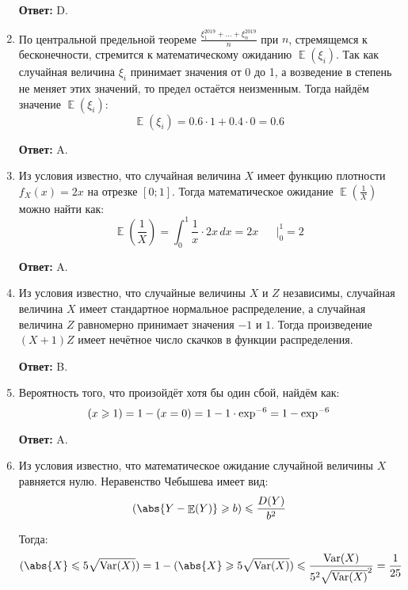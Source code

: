 \documentclass[a4paper]{article} %
\DeclareMathOperator{\Var}{Var}
\DeclareMathOperator{\E}{\mathbb{E}}
\let\P\relax
\DeclareMathOperator{\P}{\mathbb{P}}
\renewcommand{\le}{\leqslant}
\renewcommand{\ge}{\geqslant}
\begin{document}
\begin{enumerate}
    \textbf{Ответ:} D.
    
    
    \item
    По центральной предельной теореме $\frac{\xi_{1}^{2019} + \ldots + \xi_{n}^{2019}}{n}$ при $n$, стремящемся к бесконечности, стремится к математическому ожиданию $\E(\xi_{i})$.
    Так как случайная величина $\xi_{i}$ принимает значения от 0 до 1, а возведение в степень не меняет этих значений, то предел остаётся неизменным.
    Тогда найдём значение $\E(\xi_{i})$:
    \[
    \E(\xi_{i}) = 0.6 \cdot 1 + 0.4 \cdot 0 = 0.6
    \]

    \textbf{Ответ:} A.
    
    \item
    Из условия известно, что случайная величина $X$ имеет функцию плотности $f_{X}(x) = 2x$ на отрезке $[0; 1]$.
    Тогда математическое ожидание $\E\left(\frac{1}{X} \right)$ можно найти как:
    \[
    \E\left(\frac{1}{X} \right) = \int_{0}^{1} \frac{1}{x} \cdot 2x \,dx = 2x \left.\begin{matrix} & \\ & \end{matrix}\right|_{0}^{1} = 2
    \]
    
    \textbf{Ответ:} A.
    
    
    \item
    Из условия известно, что случайные величины $X$ и $Z$ независимы, случайная величина $X$ имеет стандартное нормальное распределение, а случайная величина $Z$ равномерно принимает значения $-1$ и $1$.
    Тогда произведение $(X + 1)Z$ имеет нечётное число скачков в функции распределения.
    
    \textbf{Ответ:} B.
    
    
    \item
    Вероятность того, что произойдёт хотя бы один сбой, найдём как:
    \[
    \P(x \ge 1) = 1 - \P(x = 0) = 1 - 1 \cdot \exp^{-6} = 1 - \exp^{-6}
    \]
    
    \textbf{Ответ:} A.
    
    
    \item
    Из условия известно, что математическое ожидание случайной величины $X$ равняется нулю.
    Неравенство Чебышева имеет вид:
    \[
    \P(\abs{Y - \E(Y)} \ge b) \le \frac{D(Y)}{b^{2}}
    \]
    
    Тогда:
    \[
    \P(\abs{X} \le 5\sqrt{\Var(X)}) = 1 - \P(\abs{X} \ge 5\sqrt{\Var(X)}) \le \frac{\Var(X)}{5^{2}\sqrt{\Var(X)}^{2}} = \frac{1}{25}
    \]
    

\end{enumerate}
\end{document}
